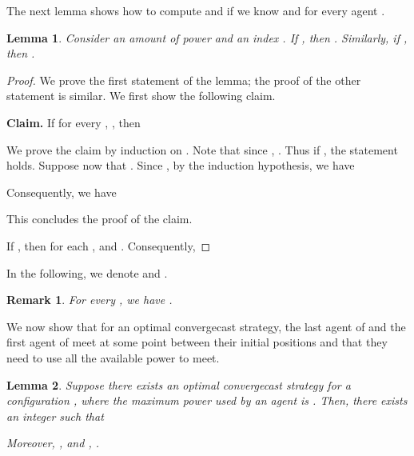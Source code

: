 \documentclass{article}
\newtheorem{lemma}{Lemma}
\newtheorem{remark}{Remark}
\newcommand\convergecast{convergecast\xspace}
\begin{document}
The next lemma shows how to compute  and 
if we know  and  for every agent .

\begin{lemma}\label{lem-eqn-reach}
Consider an amount of power  and an index . If , then . Similarly, if , then .
\end{lemma}



\begin{proof}
We prove the first statement of the lemma; the proof of the other statement is similar.  We
first show the following claim.
 
\noindent \textbf{Claim.}
If for every , , then 

We prove the claim by induction on .
Note that since , .  Thus if , the statement holds.
Suppose now that .  Since , by the induction hypothesis,
we have

  

Consequently, we have 

This concludes the proof of the claim.

If , then for each ,  and . Consequently, 


\end{proof}










In the following, we denote  and .

\begin{remark}\label{rem-SLR}
For every , we have .
\end{remark}


We now show that for an optimal {\convergecast} strategy, the last agent
of  and the first agent of  meet at some point between their initial
positions and that they need to use all the available power  to
meet. 

\begin{lemma}\label{lem-egalite-reach}
Suppose there exists an optimal {\convergecast} strategy for a
configuration , where the maximum power used by an agent is
.  Then, there exists an integer  such that 

Moreover, ,  and
, .
\end{lemma}
\end{document}
